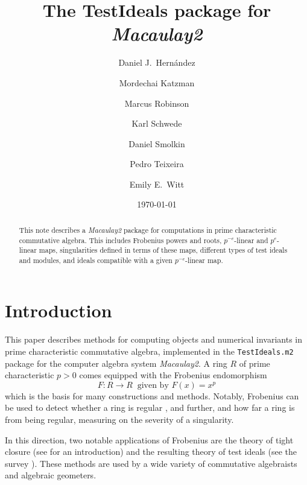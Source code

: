 \documentclass[11pt]{amsart}
\begin{document}
\title{The  {TestIdeals} package for \emph{Macaulay2}}
\author{Daniel J.\ Hern\'andez}
\author{Mordechai Katzman}
\author{Marcus Robinson}
\author{Karl Schwede}
\author{Daniel Smolkin}
\author{Pedro Teixeira}
\author{Emily E.\ Witt}
\date{\today}
\address{Department of Mathematics, University of Utah, 155 S 1400 E Room 233, Salt Lake City, UT, 84112}

\begin{abstract}
	This note describes a \emph{Macaulay2} package for computations in prime characteristic commutative algebra.  This includes Frobenius powers and roots, $p^{-e}$-linear and $p^{e}$-linear  maps,
  singularities defined in terms of these maps, different types of test ideals and modules, and ideals compatible with a given $p^{-e}$-linear map.
\end{abstract}




\maketitle

\section{Introduction}

This paper describes methods for computing objects and numerical invariants in prime characteristic commutative algebra, implemented in the {\tt TestIdeals.m2} package for the computer algebra system \emph{Macaulay2}.
A ring $R$ of prime characteristic $p>0$ comes equipped with the Frobenius endomorphism
\[ F: R \to R \ \text{ given by } F(x) =  x^p \]
which is the basis for many constructions and methods.  Notably, Frobenius can be used to detect whether a ring is regular \cite{KunzCharacterizationsOfRegularLocalRings}, and further, and
how far a ring is from being regular, measuring on the severity of a singularity.

In this direction, two notable applications of Frobenius are the theory of tight closure
(see \cite{HochsterHunekeTC1,HochsterFoundations} for an introduction)
and the resulting theory of test ideals
(see the survey \cite{SchwedeTuckerTestIdealSurvey}).  These methods are used by a wide variety of commutative algebraists and algebraic geometers.
\end{document}
